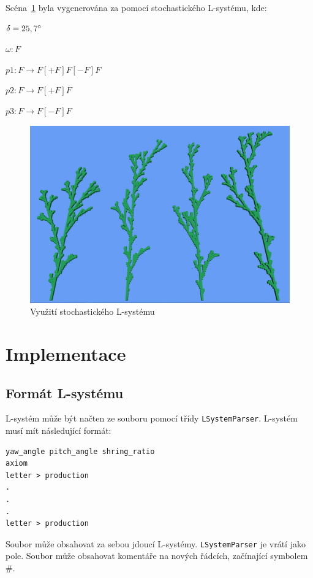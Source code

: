 \documentclass[thesis=M,czech]{FITthesis}[2019/12/23]
\begin{document}
Scéna~\ref{fig:plant_stoch} byla vygenerována za pomocí stochastického L-systému, kde:

\bigskip 
$\delta = 25,7\degree$

\medskip
$\omega: F$

\medskip
$p1: F \rightarrow F[+F]F[-F]F$

\medskip
$p2: F \rightarrow F[+F]F$

\medskip
$p3: F \rightarrow F[-F]F$

\begin{figure}\centering
	\includegraphics[width=\textwidth]{images/plant_stoch}
	\caption[Využití stochastického L-systému]{Využití stochastického L-systému}\label{fig:plant_stoch}
\end{figure}

\section{Implementace}
\subsection{Formát L-systému}

L-systém může být načten ze souboru pomocí třídy \texttt{LSystemParser}. L-systém musí mít následující formát:

\begin{verbatim}
yaw_angle pitch_angle shring_ratio
axiom
letter > production
.
.
.
letter > production
\end{verbatim}

Soubor může obsahovat za sebou jdoucí L-systémy. \texttt{LSystemParser} je vrátí jako pole. Soubor může obsahovat komentáře na nových řádcích, začínající symbolem \#.
\end{document}
